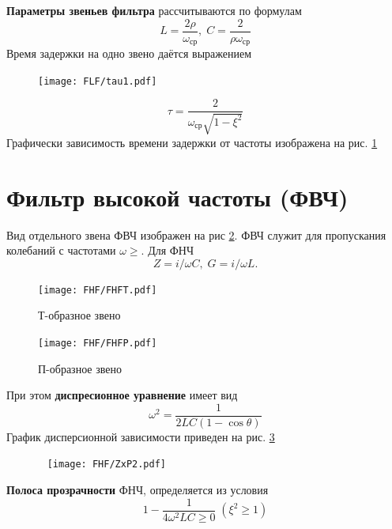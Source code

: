 \textbf{Параметры звеньев фильтра} рассчитываются по формулам
\begin{equation}
	\label{eq:5.5}
	L=\frac{2\rho}{\omega_{\text{ср}}},\;
	C=\frac{2}{\rho\omega_{\text{ср}}}
\end{equation}
Время задержки на одно звено даётся выражением
\begin{figure}[H]
	\centering
	\texttt{[image: FLF/tau1.pdf]}
	\caption{}
	\label{fig:1.4}
\end{figure}
\begin{equation}
\label{eq:5.6}
\tau=\frac{2}{\omega_{\text{ср}}\sqrt{1-\xi^2}}
\end{equation}
Графически зависимость времени задержки от частоты изображена на рис. \ref{fig:1.4}
\section{Фильтр высокой частоты (ФВЧ)} 
Вид отдельного звена ФВЧ изображен на рис \ref{fig:6.1}. ФВЧ служит для пропускания колебаний с частотами $\omega\geq$. Для ФНЧ
\begin{equation}
\label{eq:6.1.1}
Z=i/\omega C,\;G=i/\omega L.
\end{equation}
\begin{figure}[h!]
	\begin{minipage}{0.49\linewidth}
		\centering
		\texttt{[image: FHF/FHFT.pdf]}
		\caption*{Т-образное звено}
	\end{minipage}
	\begin{minipage}{0.49\linewidth}
		\centering
		\texttt{[image: FHF/FHFP.pdf]}
		\caption*{П-образное звено}
	\end{minipage}
	\caption{}
	\label{fig:6.1}
\end{figure}
При этом \textbf{диспресионное уравнение} имеет вид 
\begin{equation}
\label{eq:6.1.2}
\omega^2=\frac{1}{2LC(1-\cos\theta)}
\end{equation}
График дисперсионной зависимости приведен на рис. \ref{fig:6.2}
\begin{figure}[h!]
	\centering 
	\texttt{[image: FHF/ZxP2.pdf]}
	\caption{}
	\label{fig:6.2}
\end{figure}


\textbf{Полоса прозрачности} ФНЧ, определяется из условия 
\begin{equation}
\label{eq:6.1.3}
1-\frac{1}{4\omega^2LC\geq0}\;(\xi^2\geq1)
\end{equation}

